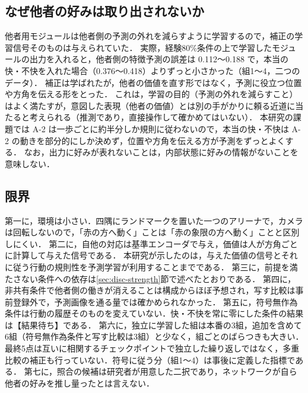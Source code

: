 \subsection{なぜ他者の好みは取り出されないか}\label{sec:disc-shortcut}
他者用モジュールは他者側の予測の外れを減らすように学習するので，補正の学習信号そのものは与えられていた．
実際，経験80\%条件の上で学習したモジュールの出力を入れると，他者側の特徴予測の誤差は 0.112〜0.188 で，本当の快・不快を入れた場合（0.376〜0.418）よりずっと小さかった（組1〜4，二つのデータ）．
補正は学ばれたが，他者の価値を直す形ではなく，予測に役立つ位置や方角を伝える形をとった．
これは，学習の目的（予測の外れを減らすこと）はよく満たすが，意図した表現（他者の価値）とは別の手がかりに頼る近道\cite{geirhos2020shortcut}に当たると考えられる（推測であり，直接操作して確かめてはいない）．
本研究の課題では A-2 は一歩ごとに約半分しか規則に従わないので，本当の快・不快は A-2 の動きを部分的にしか決めず，位置や方角を伝える方が予測をずっとよくする．
なお，出力に好みが表れないことは，内部状態に好みの情報がないことを意味しない．

\subsection{限界}\label{sec:limitations}
第一に，環境は小さい．四隅にランドマークを置いた一つのアリーナで，カメラは回転しないので，「赤の方へ動く」ことは「赤の象限の方へ動く」ことと区別しにくい．
第二に，自他の対応は基準エンコーダで与え，価値は人が方角ごとに計算して与えた信号である．
本研究が示したのは，与えた価値の信号とそれに従う行動の規則性を予測学習が利用することまでである．
第三に，前提を満たさない条件への依存は\ref{sec:disc-strength}節で述べたとおりである．
第四に，非共有条件で他者側の働きが消えることは構成からほぼ予想され，写す比較は事前登録外で，予測画像を通る量では確かめられなかった．
第五に，符号無作為条件は行動の履歴そのものを変えていない．快・不快を常に零にした条件の結果は【結果待ち】である．
第六に，独立に学習した組は本番の3組，追加を含めて6組（符号無作為条件と写す比較は3組）と少なく，組ごとのばらつきも大きい．最終5点は互いに相関するチェックポイントで独立した繰り返しではなく，多重比較の補正も行っていない．符号に従う分（組1〜4）は事後に定義した指標である．
第七に，照合の候補は研究者が用意した二択であり，ネットワークが自ら他者の好みを推し量ったとは言えない．

